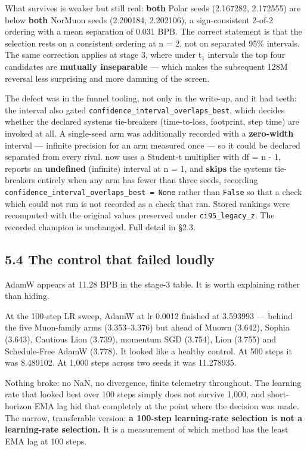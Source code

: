 What survives is weaker but still real: \textbf{both} Polar seeds (2.167282, 2.172555) are below
\textbf{both} NorMuon seeds (2.200184, 2.202106), a sign-consistent 2-of-2 ordering with a mean
separation of 0.031 BPB. The correct statement is that the selection rests on a consistent
ordering at n = 2, not on separated 95\% intervals. The same correction applies at stage 3, where
under t$_1$ intervals the top four candidates are \textbf{mutually inseparable} --- which makes the
subsequent 128M reversal less surprising and more damning of the screen.

The defect was in the funnel tooling, not only in the write-up, and it had teeth: the interval
also gated \texttt{confidence\_interval\_overlaps\_best}, which decides whether the declared systems
tie-breakers (time-to-loss, footprint, step time) are invoked at all. A single-seed arm was
additionally recorded with a \textbf{zero-width} interval --- infinite precision for an arm measured
once --- so it could be declared separated from every rival.  now uses a
Student-t multiplier with df = n - 1, reports an \textbf{undefined} (infinite) interval at n = 1, and
\textbf{skips} the systems tie-breakers entirely when any arm has fewer than three seeds, recording
\texttt{confidence\_interval\_overlaps\_best\ =\ None} rather than \texttt{False} so that a check which could not run
is not recorded as a check that ran. Stored rankings were recomputed with the original values
preserved under \texttt{ci95\_legacy\_z}. The recorded champion is unchanged. Full detail in
 \S2.3.

\subsection{5.4 The control that failed loudly}\label{the-control-that-failed-loudly}

AdamW appears at 11.28 BPB in the stage-3 table. It is worth explaining rather than hiding.

At the 100-step LR sweep, AdamW at lr 0.0012 finished at 3.593993 --- behind the five Muon-family
arms (3.353--3.376) but ahead of Muown (3.642), Sophia (3.643), Cautious Lion (3.739), momentum SGD
(3.754), Lion (3.755) and Schedule-Free AdamW (3.778). It looked like a healthy control. At 500 steps it was 8.489102. At 1,000 steps across two seeds it was 11.278935.

Nothing broke: no NaN, no divergence, finite telemetry throughout. The learning rate that looked
best over 100 steps simply does not survive 1,000, and short-horizon EMA lag hid that completely
at the point where the decision was made. The narrow, transferable version: \textbf{a 100-step
learning-rate selection is not a learning-rate selection.} It is a measurement of which method
has the least EMA lag at 100 steps.

